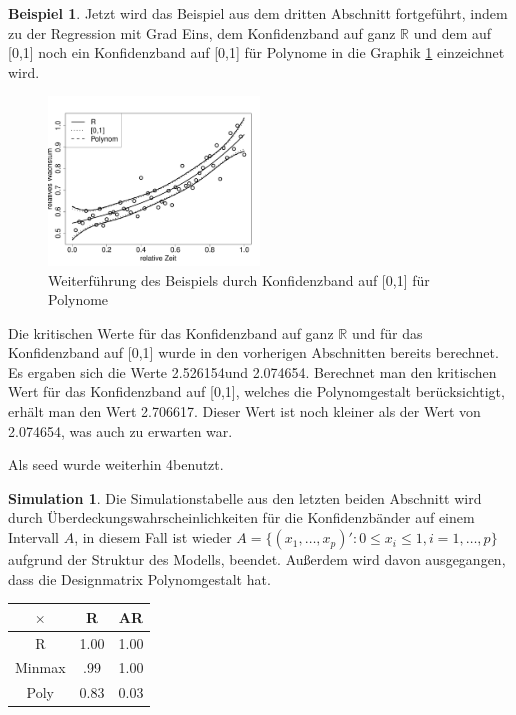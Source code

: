 \documentclass[12pt,a4paper]{article}
\theoremstyle{definition}
\newtheorem{Beispiel}[Definition]{Beispiel}
\theoremstyle{definition}
\theoremstyle{definition}
\newtheorem{Simulation}[Definition]{Simulation}
\theoremstyle{definition}
\newcommand{\cR}{2.526154}
\newcommand{\seedsimulation}{4}
\newcommand{\cA}{2.074654}
\newcommand{\cAP}{2.706617}
\newcommand{\UeberRR}{1.00}
\newcommand{\UeberRMinmax}{.99}
\newcommand{\UeberRMinmaxPoly}{0.83}
\newcommand{\UeberARR}{1.00}
\newcommand{\UeberARMinmax}{1.00}
\newcommand{\UeberARMinmaxPoly}{0.03}
\begin{document}
\begin{Beispiel}
Jetzt wird das Beispiel aus dem dritten Abschnitt fortgeführt, indem zu der Regression mit Grad Eins, dem Konfidenzband auf ganz $\mathbb{R}$ und dem auf [0,1] noch ein Konfidenzband auf [0,1] für Polynome in die Graphik \ref{KB-poly-BSP} einzeichnet wird.

\begin{figure}[H] 
  \centering
     \includegraphics[width=0.5\textwidth]{Bsp-KB-poly}
  \caption{Weiterführung des Beispiels durch Konfidenzband auf [0,1] für Polynome}
  \label{KB-poly-BSP}
\end{figure}

Die kritischen Werte für das Konfidenzband auf ganz $\mathbb{R}$ und für das Konfidenzband auf [0,1] wurde in den vorherigen Abschnitten bereits berechnet. Es ergaben sich die Werte \cR und \cA . Berechnet man den kritischen Wert für das Konfidenzband auf [0,1], welches die Polynomgestalt berücksichtigt, erhält man den Wert \cAP . Dieser Wert ist noch kleiner als der Wert von \cA , was auch zu erwarten war.

Als seed wurde weiterhin \seedsimulation benutzt.

\end{Beispiel}

\begin{Simulation}
Die Simulationstabelle aus den letzten beiden Abschnitt wird durch Überdeckungswahrscheinlichkeiten für die Konfidenzbänder auf einem Intervall $A$, in diesem Fall ist wieder $A = \{ (x_1, \ldots, x_p)' : 0 \leq x_i \leq 1, i=1, \ldots, p \}$ aufgrund der Struktur des Modells, beendet. Außerdem wird davon ausgegangen, dass die Designmatrix Polynomgestalt hat.

\begin{center}
\begin{tabular}{|c|c|c|}
\hline 
$\times$ & R & AR \\ 
\hline 
R		& \UeberRR			& \UeberARR \\ 
\hline 
Minmax	& \UeberRMinmax	 	& \UeberARMinmax \\ 
\hline 
Poly 	& \UeberRMinmaxPoly & \UeberARMinmaxPoly \\ 
\hline 
\end{tabular} 
\end{center}

\end{Simulation}
\end{document}

